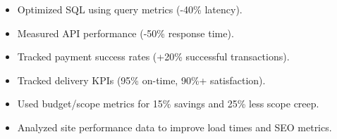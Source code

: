 \vspace{4pt}
\begin{itemize}
  \item Optimized SQL using query metrics (-40\% latency).
  \item Measured API performance (-50\% response time).
  \item Tracked payment success rates (+20\% successful transactions).
\end{itemize}
\vspace{4pt}
\begin{itemize}
  \item Tracked delivery KPIs (95\% on-time, 90\%+ satisfaction).
  \item Used budget/scope metrics for 15\% savings and 25\% less scope creep.
\end{itemize}
\vspace{4pt}
\begin{itemize}
  \item Analyzed site performance data to improve load times and SEO metrics.
\end{itemize}
